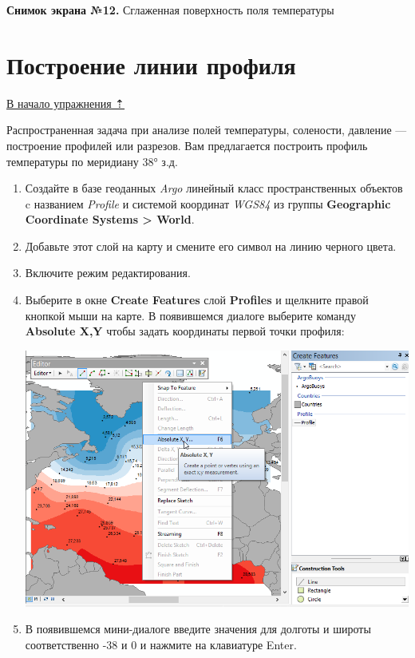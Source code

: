 \documentclass[12pt,]{book}
\begin{document}
\begin{enumerate}
  \textbf{Снимок экрана №12.} Сглаженная поверхность поля температуры
\end{enumerate}

\hypertarget{interpolation-profile}{%
\section{Построение линии профиля}\label{interpolation-profile}}

\protect\hyperlink{interpolation}{В начало упражнения ⇡}

Распространенная задача при анализе полей температуры, солености, давление --- построение профилей или разрезов. Вам предлагается построить профиль температуры по меридиану 38° з.д.

\begin{enumerate}
\def\labelenumi{\arabic{enumi}.}
\item
  Создайте в базе геоданных \emph{Argo} линейный класс пространственных объектов c названием \emph{Profile} и системой координат \emph{WGS84} из группы \textbf{Geographic Coordinate Systems \textgreater{} World}.
\item
  Добавьте этот слой на карту и смените его символ на линию черного цвета.
\item
  Включите режим редактирования.
\item
  Выберите в окне \textbf{Create Features} слой \textbf{Profiles} и щелкните правой кнопкой мыши на карте. В появившемся диалоге выберите команду \textbf{Absolute X,Y} чтобы задать координаты первой точки профиля:

  \includegraphics{images/Ex17/image17.png}
\item
  В появившемся мини-диалоге введите значения для долготы и широты соответственно -38 и 0 и нажмите на клавиатуре Enter.


\end{enumerate}
\end{document}
